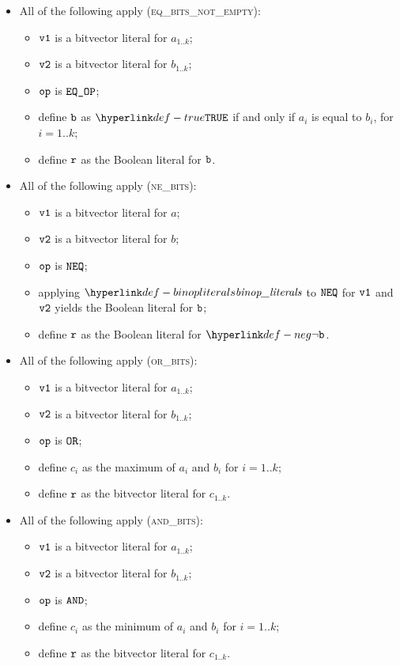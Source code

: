 \documentclass{book}
\newcommand\ProseOrTypeError[0]{\ProseTerminateAs{\TypeErrorConfig}}
\begin{document}
\begin{itemize}
  \item All of the following apply (\textsc{eq\_bits\_not\_empty}):
  \begin{itemize}
    \item $\texttt{v1}$ is a bitvector literal for $a_{1..k}$;
    \item $\texttt{v2}$ is a bitvector literal for $b_{1..k}$;
    \item $\texttt{op}$ is $\texttt{EQ\_OP}$;
    \item define $\texttt{b}$ as $\True$ if and only if $a_i$ is equal to $b_i$, for $i=1..k$;
    \item define $\texttt{r}$ as the Boolean literal for $\texttt{b}$.
  \end{itemize}

  \item All of the following apply (\textsc{ne\_bits}):
  \begin{itemize}
    \item $\texttt{v1}$ is a bitvector literal for $a$;
    \item $\texttt{v2}$ is a bitvector literal for $b$;
    \item $\texttt{op}$ is $\texttt{NEQ}$;
    \item applying $\binopliterals$ to $\texttt{NEQ}$ for $\texttt{v1}$ and $\texttt{v2}$ yields the Boolean literal for $\texttt{b}$\ProseOrTypeError;
    \item define $\texttt{r}$ as the Boolean literal for $\neg\vb$.
  \end{itemize}

  \item All of the following apply (\textsc{or\_bits}):
  \begin{itemize}
    \item $\texttt{v1}$ is a bitvector literal for $a_{1..k}$;
    \item $\texttt{v2}$ is a bitvector literal for $b_{1..k}$;
    \item $\texttt{op}$ is $\texttt{OR}$;
    \item define $c_i$ as the maximum of $a_i$ and $b_i$ for $i=1..k$;
    \item define $\texttt{r}$ as the bitvector literal for $c_{1..k}$.
  \end{itemize}

  \item All of the following apply (\textsc{and\_bits}):
  \begin{itemize}
    \item $\texttt{v1}$ is a bitvector literal for $a_{1..k}$;
    \item $\texttt{v2}$ is a bitvector literal for $b_{1..k}$;
    \item $\texttt{op}$ is $\texttt{AND}$;
    \item define $c_i$ as the minimum of $a_i$ and $b_i$ for $i=1..k$;
    \item define $\texttt{r}$ as the bitvector literal for $c_{1..k}$.
  \end{itemize}


\end{itemize}
\end{document}
